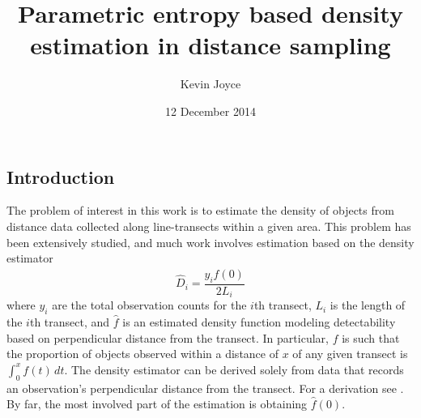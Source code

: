 \documentclass[12pt]{amsart}
\title{Parametric entropy based density estimation in distance sampling}
\author{Kevin Joyce}
\date{12 December 2014}
\renewcommand{\hat}{\widehat}
\begin{document}
\maketitle
\begin{multicols}{2}
\section{Introduction}
  
  The problem of interest in this work is to estimate the density of objects from distance data collected along line-transects within a given area.
This problem has been extensively studied, and much work involves estimation based on the density estimator
  \begin{equation}
    \hat D_i = \frac {y_i \hat f(0)}{2L_i}
  \end{equation}
  where $y_i$ are the total observation counts for the $i$th transect, $L_i$ is the length of the $i$th transect, and $\hat f$ is an estimated density function modeling detectability based on perpendicular distance from the transect.
In particular, $f$ is such that the proportion of objects observed within a distance of $x$ of any given transect is $\int_0^x f(t)\,dt$.
The density estimator can be derived solely from data that records an observation's perpendicular distance from the transect.
For a derivation see \cite{buckland2001introduction} \cite{thompson2012sampling}.
By far, the most involved part of the estimation is obtaining $\hat f(0)$.


\end{multicols}
\end{document}
